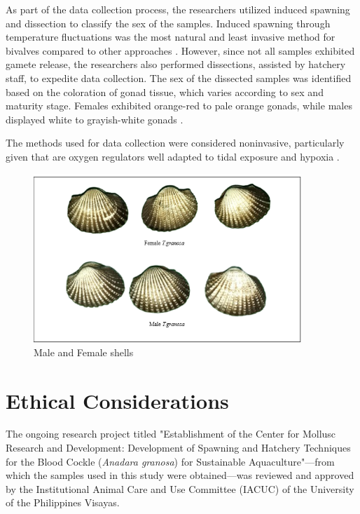 As part of the data collection process, the researchers utilized induced spawning and dissection to classify the sex of the samples. Induced spawning through temperature fluctuations was the most natural and least invasive method for bivalves compared to other approaches \cite{aji}. However, since not all samples exhibited gamete release, the researchers also performed dissections, assisted by hatchery staff, to expedite data collection. The sex of the dissected samples was identified based on the coloration of gonad tissue, which varies according to sex and maturity stage. Females exhibited orange-red to pale orange gonads, while males displayed white to grayish-white gonads \cite{may2021}.

The methods used for data collection were considered noninvasive, particularly given that \Tgranosa are oxygen regulators well adapted to tidal exposure and hypoxia \cite{davenport1986}.

\begin{figure}[!htbp]
	\centering
	\includegraphics[width=0.9\textwidth]{figures/male-female T.granosa.png}
	\caption{Male and Female \Tegillarcagranosa shells}
	\label{fig:granosa_shells}
\end{figure}

\section{Ethical Considerations}
\label{sec:ethical}

The ongoing research project titled "Establishment of the Center for Mollusc Research and Development: Development of Spawning and Hatchery Techniques for the Blood Cockle (\textit{Anadara granosa}) for Sustainable Aquaculture"—from which the samples used in this study were obtained—was reviewed and approved by the Institutional Animal Care and Use Committee (IACUC) of the University of the Philippines Visayas. 

